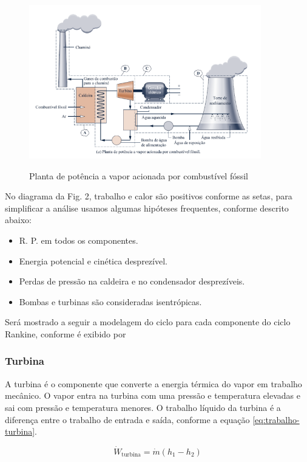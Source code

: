\documentclass[
	article,			%
	11pt,				%
	oneside,			%
	a4paper,			%
	english,			%
	brazil,				%
	sumario=tradicional
	]{abntex2}
\begin{document}
\begin{figure}[h]
	\centering
	\includegraphics[width=0.9\textwidth]{./images/planta-exemplo.png}
	\label{fig:planta-exemplo}
	\caption{Planta de potência a vapor acionada por combustível fóssil}
\end{figure}

No diagrama da Fig. 2, trabalho e calor são positivos conforme as setas, para simplificar a análise usamos algumas hipóteses frequentes, conforme descrito abaixo:
\begin{itemize}
	\item R. P. em todos os componentes.
	\item Energia potencial e cinética desprezível.
    \item Perdas de pressão na caldeira e no condensador desprezíveis.
    \item Bombas e turbinas são consideradas isentrópicas.
\end{itemize}

Será mostrado a seguir a modelagem do ciclo para cada componente do ciclo Rankine, conforme é exibido por 

\subsubsection{Turbina}

A turbina é o componente que converte a energia térmica do vapor em trabalho mecânico. O vapor entra na turbina com uma pressão e temperatura elevadas e sai com pressão e temperatura menores. O trabalho líquido da turbina é a diferença entre o trabalho de entrada e saída, conforme a equação \ref{eq:trabalho-turbina}.

\begin{equation}
	\dot{W}_{\text{turbina}} = \dot{m}(h_1 - h_2)
	\label{eq:trabalho-turbina}
\end{equation}
\end{document}
